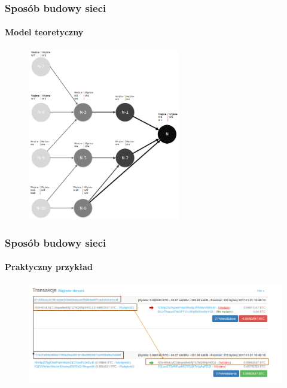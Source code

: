\documentclass[]{beamer}
\newcommand{\frameheight}{7.5cm}
\begin{document}
\begin{frame}
 \frametitle{Sposób budowy sieci}
 \framesubtitle{Model teoretyczny}
 \begin{figure}
	\centering
 	\includegraphics[height=\frameheight]{pictures/visio/siec.png}
 \end{figure}
\end{frame}

\begin{frame}
 \frametitle{Sposób budowy sieci}
 \framesubtitle{Praktyczny przykład}
  \begin{figure}
 		\includegraphics[width=1\linewidth]{pictures/transakcje.png}
	\end{figure}
\end{frame}
\end{document}
